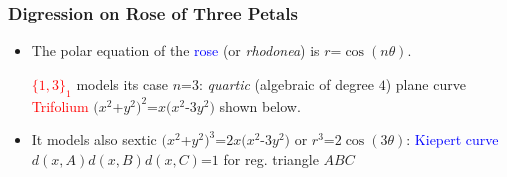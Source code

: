\documentclass{beamer}
\begin{document}
\begin{frame}\frametitle{Digression on Rose of Three Petals}
\vspace{-2.8mm}
 \begin{itemize}
\item The polar equation of  the  \textcolor{blue}{rose} (or {\em 
rhodonea}) is  $r$=$\cos({n\theta})$.

\textcolor{red}{$\{1,3\}_{1}$} models its case 
$n$=$3$:  {\em 
quartic}  
 (algebraic of degree $4$) plane curve  \textcolor{red}{Trifolium}
 $(x^2$+$y^2)^2$=$x(x^2$-$3y^2)$ shown below.
\item
It models also sextic 
$(x^2$+$y^2)^3$=$2x(x^2$-$3y^2)$ or  $r^3$=$2\cos({3\theta})$: 
\textcolor{blue}{Kiepert  
curve}
$d(x,A)d(x,B)d(x,C)$=$1$ for  reg. triangle $ABC$ 
 \end{itemize}
\begin{center} 
\par
\end{center} 
 \end{frame}
\end{document}
